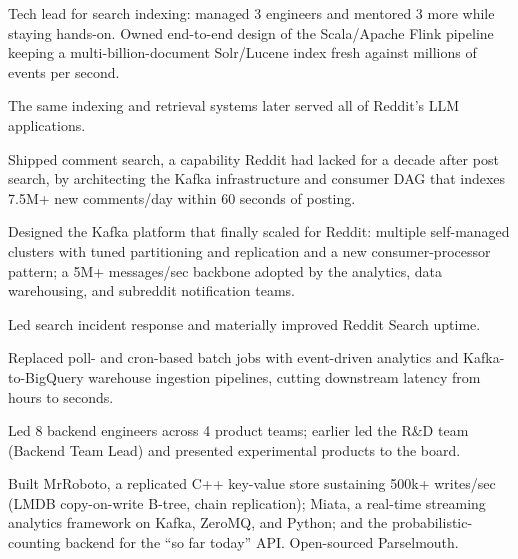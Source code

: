 \documentclass{standard-resume}
\begin{document}
\begin{bullets}
    \item Tech lead for search indexing: managed 3 engineers and mentored 3
          more while staying hands-on. Owned end-to-end design of the
          Scala/Apache Flink pipeline keeping a multi-billion-document
          Solr/Lucene index fresh against millions of events per second.
    \item The same indexing and retrieval systems later served all of
          Reddit's LLM applications.\ 
    \item Shipped comment search, a capability Reddit had lacked for a decade
          after post search, by architecting the Kafka infrastructure and
          consumer DAG that indexes 7.5M+ new comments/day within 60 seconds
          of posting.\ 
    \item Designed the Kafka platform that finally scaled for Reddit: multiple
          self-managed clusters with tuned partitioning and replication and a
          new consumer-processor pattern; a 5M+ messages/sec backbone adopted
          by the analytics, data warehousing, and subreddit notification
          teams.
    \item Led search incident response and materially improved Reddit Search
          uptime.\ 
\end{bullets}
\begin{bullets}
    \item Replaced poll- and cron-based batch jobs with event-driven analytics
          and Kafka-to-BigQuery warehouse ingestion pipelines, cutting
          downstream latency from hours to seconds.
\end{bullets}

\begin{bullets}
    \item Led 8 backend engineers across 4 product teams; earlier led the
          R\&D team (Backend Team Lead) and presented experimental products to
          the board.
    \item Built MrRoboto, a replicated C++ key-value store sustaining 500k+
          writes/sec (LMDB copy-on-write B-tree, chain replication); Miata, a
          real-time streaming analytics framework on Kafka, ZeroMQ, and
          Python; and the probabilistic-counting backend for the ``so far
          today'' API\@. Open-sourced Parselmouth.
\end{bullets}
\end{document}
